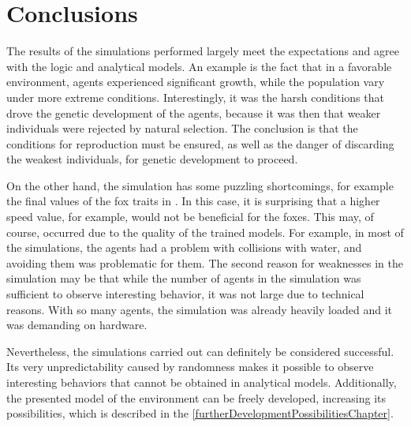 \chapter{Conclusions}

The results of the simulations performed largely meet the expectations and agree with the logic and analytical models. An example is the fact that in a favorable environment, agents experienced significant growth, while the population vary under more extreme conditions. Interestingly, it was the harsh conditions that drove the genetic development of the agents, because it was then that weaker individuals were rejected by natural selection. The conclusion is that the conditions for reproduction must be ensured, as well as the danger of discarding the weakest individuals, for genetic development to proceed.

On the other hand, the simulation has some puzzling shortcomings, for example the final values of the fox traits in . In this case, it is surprising that a higher speed value, for example, would not be beneficial for the foxes. This may, of course, occurred due to the quality of the trained models. For example, in most of the simulations, the agents had a problem with collisions with water, and avoiding them was problematic for them. The second reason for weaknesses in the simulation may be that while the number of agents in the simulation was sufficient to observe interesting behavior, it was not large due to technical reasons. With so many agents, the simulation was already heavily loaded and it was demanding on hardware.

Nevertheless, the simulations carried out can definitely be considered successful. Its very unpredictability caused by randomness makes it possible to observe interesting behaviors that cannot be obtained in analytical models. Additionally, the presented model of the environment can be freely developed, increasing its possibilities, which is described in the \autoref{furtherDevelopmentPossibilitiesChapter}. 